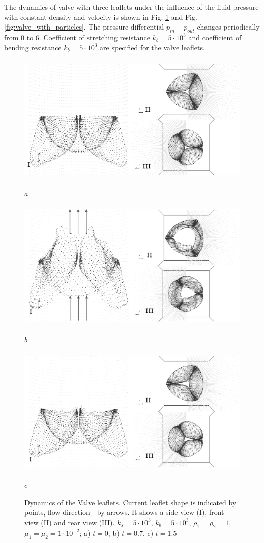 \documentclass[runningheads,a4paper]{llncs}
\begin{document}
The dynamics of valve with three leaflets under the influence of the fluid pressure with constant density and velocity is shown in Fig. \ref{fig:valve} and Fig. \ref{fig:valve_with_particles}.
The pressure differential $p_{in} - p_{out}$ changes periodically from 0 to 6. Coefficient of stretching resistance $k_b = 5 \cdot 10^3$ and coefficient of
bending resistance $k_b = 5 \cdot 10^3$ are specified for the valve leaflets.


\begin{figure}
\centering
\includegraphics[height=6.2cm]{images/valve_1_gray.png}

$a$

\includegraphics[height=6.2cm]{images/valve_2_gray.png}

$b$

\includegraphics[height=6.2cm]{images/valve_3_gray.png}

$c$

\caption{Dynamics of the Valve leaflets. Current leaflet shape is indicated by points, flow direction - by arrows.
It shows a side view (I), front view (II) and rear view (III). $k_s = 5 \cdot 10^3$, $k_b = 5 \cdot 10^3$, $\rho_1 = \rho_2 = 1$,
$\mu_1 = \mu_2 = 1 \cdot 10^{-2}$; a) $t=0$, b) $t=0.7$, c) $t=1.5$}
\label{fig:valve}
\end{figure}
\end{document}
